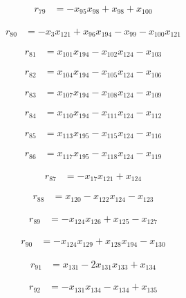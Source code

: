\begin{align*}
r_{79}&=-x_{95}x_{98}+x_{98}+x_{100}
\end{align*}

\begin{align*}
r_{80}&=-x_{3}x_{121}+x_{96}x_{194}-x_{99}-x_{100}x_{121}
\end{align*}

\begin{align*}
r_{81}&=x_{101}x_{194}-x_{102}x_{124}-x_{103}
\end{align*}

\begin{align*}
r_{82}&=x_{104}x_{194}-x_{105}x_{124}-x_{106}
\end{align*}

\begin{align*}
r_{83}&=x_{107}x_{194}-x_{108}x_{124}-x_{109}
\end{align*}

\begin{align*}
r_{84}&=x_{110}x_{194}-x_{111}x_{124}-x_{112}
\end{align*}

\begin{align*}
r_{85}&=x_{113}x_{195}-x_{115}x_{124}-x_{116}
\end{align*}

\begin{align*}
r_{86}&=x_{117}x_{195}-x_{118}x_{124}-x_{119}
\end{align*}

\begin{align*}
r_{87}&=-x_{17}x_{121}+x_{124}
\end{align*}

\begin{align*}
r_{88}&=x_{120}-x_{122}x_{124}-x_{123}
\end{align*}

\begin{align*}
r_{89}&=-x_{124}x_{126}+x_{125}-x_{127}
\end{align*}

\begin{align*}
r_{90}&=-x_{124}x_{129}+x_{128}x_{194}-x_{130}
\end{align*}

\begin{align*}
r_{91}&=x_{131}-2x_{131}x_{133}+x_{134}
\end{align*}

\begin{align*}
r_{92}&=-x_{131}x_{134}-x_{134}+x_{135}
\end{align*}

